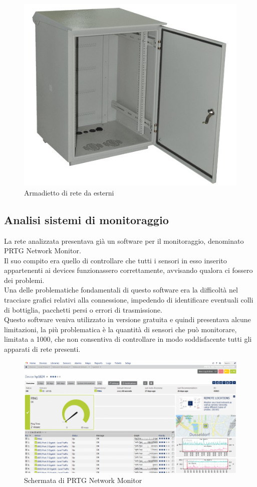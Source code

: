 \documentclass[Realizzazione.tex]{subfiles}
\begin{document}
\begin{figure}[H]
	\centering
	\includegraphics[width=0.5\linewidth]{"images/Outdoor rack"}
	\caption{Armadietto di rete da esterni}
	\label{fig:Armadietto di rete da esterni}
\end{figure}

\subsection{Analisi sistemi di monitoraggio}
La rete analizzata presentava già un software per il monitoraggio, denominato PRTG Network Monitor. \\
Il suo compito era quello di controllare che tutti i sensori in esso inserito appartenenti ai devices funzionassero correttamente, avvisando qualora ci fossero dei problemi. \\
Una delle problematiche fondamentali di questo software era la difficoltà nel tracciare grafici relativi alla connessione, impedendo di identificare eventuali colli di bottiglia, pacchetti persi o errori di trasmissione. \\
Questo software veniva utilizzato in versione gratuita e quindi presentava alcune limitazioni, la più problematica è la quantità di sensori che può monitorare, limitata a 1000, che non consentiva di controllare in modo soddisfacente tutti gli apparati di rete presenti. \\

\begin{figure}[H]
	\centering
	\includegraphics[width=0.8\linewidth]{"images/PRTGStatistics"}
	\caption{Schermata di PRTG Network Monitor}
	\label{fig:Schermata di PRTG Network Monitor}
\end{figure}
\end{document}
